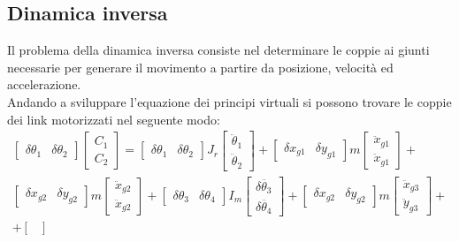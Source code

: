 \subsection{Dinamica inversa}
Il problema della dinamica inversa consiste nel determinare le coppie ai giunti necessarie per generare il movimento a partire da posizione, velocità ed accelerazione.
\\Andando a sviluppare l'equazione dei principi virtuali si possono trovare le coppie dei link motorizzati nel seguente modo:
\begin{equation}
\begin{split}
\begin{bmatrix}
\delta \theta_1 & \delta \theta_2
\end{bmatrix}
\begin{bmatrix}
C_1 \\ C_2
\end{bmatrix} 
= \begin{bmatrix}
\delta \theta_1 & \delta \theta_2
\end{bmatrix} J_r \begin{bmatrix}
\ddot{\theta}_1 \\ \ddot{\theta}_2
\end{bmatrix}+ \begin{bmatrix}
\delta x_{g1} & \delta y_{g1}
\end{bmatrix}m\begin{bmatrix}
\ddot{x}_{g1} \\ \ddot{x}_{g1}
\end{bmatrix} +
\\ \begin{bmatrix} \delta x_{g2} & \delta y_{g2}
\end{bmatrix}m\begin{bmatrix}
\ddot{x}_{g2} \\ \ddot{x}_{g2}
\end{bmatrix} +
\begin{bmatrix}
\delta \theta_3 & \delta \theta_4
\end{bmatrix}I_m \begin{bmatrix}
\delta \ddot{\theta_3} \\ \delta\ddot{\theta_4}
\end{bmatrix}+\begin{bmatrix}
\delta x_{g2} & \delta y_{g2}
\end{bmatrix} m \begin{bmatrix}
\ddot{x}_{g3} \\ \ddot{y}_{g3}
\end{bmatrix}+\\+\begin{bmatrix}

\end{bmatrix}
\end{split}
\end{equation}
